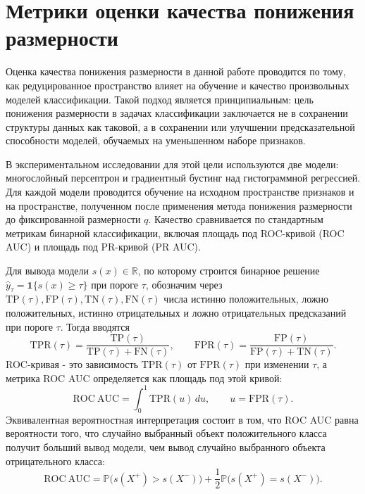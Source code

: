 \documentclass[12pt,a4paper]{article}
\begin{document}
\section{Метрики оценки качества понижения размерности}

Оценка качества понижения размерности в данной работе проводится по тому, как редуцированное пространство
влияет на обучение и качество произвольных моделей классификации.
Такой подход является принципиальным: цель понижения размерности в задачах классификации
заключается не в сохранении структуры данных как таковой, а в сохранении или улучшении
предсказательной способности моделей, обучаемых на уменьшенном наборе признаков.

В экспериментальном исследовании для этой цели используются две модели:
многослойный персептрон и градиентный бустинг над гистограммной регрессией.
Для каждой модели проводится обучение на исходном пространстве признаков и на пространстве,
полученном после применения метода понижения размерности до фиксированной размерности $q$.
Качество сравнивается по стандартным метрикам бинарной классификации,
включая площадь под ROC-кривой (ROC AUC) и площадь под PR-кривой (PR AUC).

Для вывода модели $s(x)\in\mathbb{R}$, по которому строится бинарное решение
$\widehat y_\tau=\mathbf{1}\{s(x)\ge \tau\}$ при пороге $\tau$,
обозначим через $\mathrm{TP}(\tau),\mathrm{FP}(\tau),\mathrm{TN}(\tau),\mathrm{FN}(\tau)$
числа истинно положительных, ложно положительных, истинно отрицательных и ложно отрицательных
предсказаний при пороге $\tau$. Тогда вводятся
\begin{equation}
\mathrm{TPR}(\tau)=\frac{\mathrm{TP}(\tau)}{\mathrm{TP}(\tau)+\mathrm{FN}(\tau)},\qquad
\mathrm{FPR}(\tau)=\frac{\mathrm{FP}(\tau)}{\mathrm{FP}(\tau)+\mathrm{TN}(\tau)}.
\end{equation}
ROC-кривая - это зависимость $\mathrm{TPR}(\tau)$ от $\mathrm{FPR}(\tau)$ при изменении $\tau$,
а метрика ROC AUC определяется как площадь под этой кривой:
\begin{equation}
\mathrm{ROC\ AUC}=\int_{0}^{1}\mathrm{TPR}(u)\,du,
\qquad u=\mathrm{FPR}(\tau).
\end{equation}
Эквивалентная вероятностная интерпретация состоит в том, что ROC AUC равна вероятности того,
что случайно выбранный объект положительного класса получит больший вывод модели, чем вывод случайно выбранного
объекта отрицательного класса:
\begin{equation}
\mathrm{ROC\ AUC}=\mathbb{P}\bigl(s(X^+)>s(X^-)\bigr)+\frac{1}{2}\mathbb{P}\bigl(s(X^+)=s(X^-)\bigr).
\end{equation}
\end{document}
